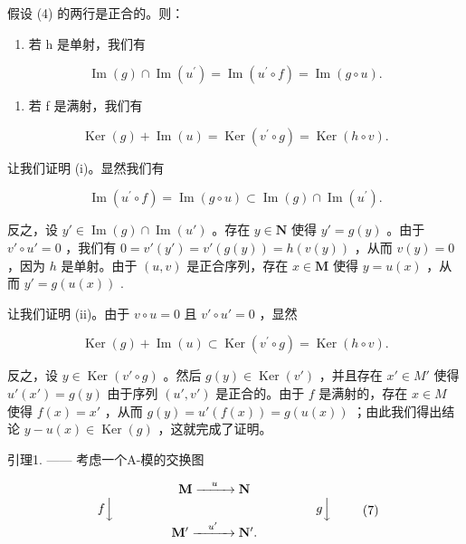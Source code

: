 假设 (4) 的两行是正合的。则：

\begin{enumerate}
\def\labelenumi{(\roman{enumi})}
\tightlist
\item
  若 h 是单射，我们有
\end{enumerate}

\[
\operatorname{Im} (g) \cap \operatorname{Im} \left(u ^ {\prime}\right) = \operatorname{Im} \left(u ^ {\prime} \circ f\right) = \operatorname{Im} (g \circ u).\tag{5}
\]

\begin{enumerate}
\def\labelenumi{(\roman{enumi})}
\setcounter{enumi}{1}
\tightlist
\item
  若 f 是满射，我们有
\end{enumerate}

\[
\operatorname{Ker} (g) + \operatorname{Im} (u) = \operatorname{Ker} \left(v ^ {\prime} \circ g\right) = \operatorname{Ker} (h \circ v).\tag{6}
\]

让我们证明 (i)。显然我们有

\[
\operatorname{Im} \left(u ^ {\prime} \circ f\right) = \operatorname{Im} (g \circ u) \subset \operatorname{Im} (g) \cap \operatorname{Im} \left(u ^ {\prime}\right).
\]

反之，设 \(y' \in \operatorname{Im}(g) \cap \operatorname{Im}(u')\) 。存在 \(y \in \mathbf{N}\) 使得 \(y' = g(y)\) 。由于 \(v' \circ u' = 0\) ，我们有 \(0 = v'(y') = v'(g(y)) = h(v(y))\) ，从而 \(v(y) = 0\) ，因为 \(h\) 是单射。由于 \((u, v)\) 是正合序列，存在 \(x \in \mathbf{M}\) 使得 \(y = u(x)\) ，从而 \(y' = g(u(x))\) .

让我们证明 (ii)。由于 \(v \circ u = 0\) 且 \(v' \circ u' = 0\) ，显然

\[
\operatorname{Ker} (g) + \operatorname{Im} (u) \subset \operatorname{Ker} \left(v ^ {\prime} \circ g\right) = \operatorname{Ker} (h \circ v).
\]

反之，设 \(y \in \operatorname{Ker}(v' \circ g)\) 。然后 \(g(y) \in \operatorname{Ker}(v')\) ，并且存在 \(x' \in M'\) 使得 \(u'(x') = g(y)\) 由于序列 \((u', v')\) 是正合的。由于 \(f\) 是满射的，存在 \(x \in M\) 使得 \(f(x) = x'\) ，从而 \(g(y) = u'(f(x)) = g(u(x))\) ；由此我们得出结论 \(y - u(x) \in \operatorname{Ker}(g)\) ，这就完成了证明。

引理1. —— 考虑一个A-模的交换图

\[
\begin{array}{c} \mathbf {M} \xrightarrow {\quad u \quad} \mathbf {N} \\ f \Big \downarrow \qquad \qquad \qquad \qquad \qquad \qquad \qquad \qquad g \Big \downarrow \\ \mathbf {M} ^ {\prime} \xrightarrow {\quad u ^ {\prime} \quad} \mathbf {N} ^ {\prime}. \end{array}\tag{7}
\]

